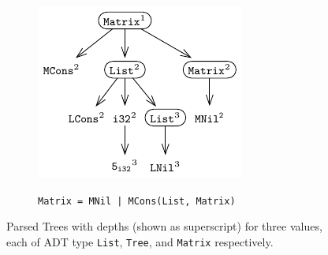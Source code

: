 \begin{figure}[H]
\begin{minipage}[c]{0.55\textwidth}
\begin{subfigure}[b]{1\textwidth}
\begin{center}
{\includegraphics[scale=1.1]{chapters/figures/figParseTreeMatrix1.pdf}}
\end{center}
\vspace{-15px}
\caption{\label{fig:matrixParseTree}{\tt Matrix = MNil | \newline MCons(List, Matrix)}}
\end{subfigure}%
\end{minipage}%
\caption{\label{fig:parseTrees}Parsed Trees with depths (shown as superscript) for three values, each of ADT type {\tt List}, {\tt Tree}, and {\tt Matrix} respectively.}
\end{figure}
